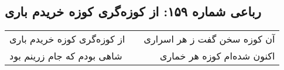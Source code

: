 \begin{center}
\section*{رباعی شماره ۱۵۹: از کوزه‌گری کوزه خریدم باری}
\label{sec:sh159}
\begin{longtable}{l p{0.5cm} r}
از کوزه‌گری کوزه خریدم باری
&&
آن کوزه سخن گفت ز هر اسراری
\\
شاهی بودم که جام زرینم بود
&&
اکنون شده‌ام کوزه هر خماری
\\
\end{longtable}
\end{center}
